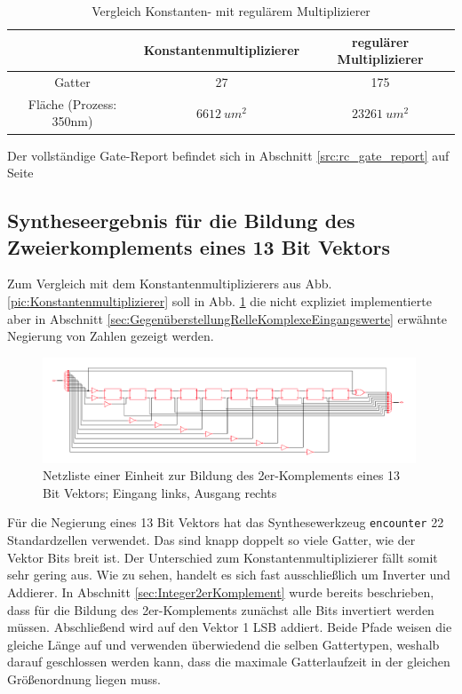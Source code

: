 \begin{table}[!ht]
 \caption{Vergleich Konstanten- mit regulärem Multiplizierer}
 \label{tab:VergleichMultiplizierer}
 \begin{tabular}{ccc}
 \hline
				& Konstantenmultiplizierer 	& regulärer Multiplizierer\\
  \hline	
  Gatter			& 27				& 175 \\
  Fläche (Prozess: 350nm)	& $\SI{6612}{um^2}$		& $\SI{23261}{um^2}$\\
  \hline
 \end{tabular}
\end{table}





Der vollständige Gate-Report befindet sich in Abschnitt \ref{src:rc_gate_report} auf Seite \pageref{src:rc_gate_report}



\subsection{Syntheseergebnis für die Bildung des Zweierkomplements eines 13 Bit Vektors}\label{sec:SyntheseergebnisBildungZweierkomplement}

Zum Vergleich mit dem Konstantenmultiplizierers aus Abb. \ref{pic:Konstantenmultiplizierer} soll in Abb. \ref{pic:13BitInverter} die nicht expliziet implementierte aber in Abschnitt
\ref{sec:GegenüberstellungRelleKomplexeEingangswerte} erwähnte Negierung von Zahlen gezeigt werden.

\begin{figure}[htpb]
\centering
\includegraphics[width=0.99\textwidth]{img/13Bit_Inverter_Netlist.png}
\caption{Netzliste einer Einheit zur Bildung des 2er-Komplements eines 13 Bit Vektors; Eingang links, Ausgang rechts}
\label{pic:13BitInverter}
\end{figure}

Für die Negierung eines 13 Bit Vektors hat das Synthesewerkzeug \texttt{encounter} 22 Standardzellen verwendet. Das sind knapp doppelt so viele Gatter, wie der Vektor 
Bits breit ist. Der Unterschied zum Konstantenmultiplizierer fällt somit sehr gering aus. 
Wie zu sehen, handelt es sich fast ausschließlich um Inverter und Addierer. In Abschnitt \ref{sec:Integer2erKomplement} wurde bereits beschrieben, dass für die Bildung des
2er-Komplements zunächst alle Bits invertiert werden müssen. Abschließend wird auf den Vektor 1 LSB addiert. 
Beide Pfade weisen die gleiche Länge auf und verwenden überwiedend die selben
Gattertypen, weshalb darauf geschlossen werden kann, dass die maximale Gatterlaufzeit in der gleichen Größenordnung liegen muss.